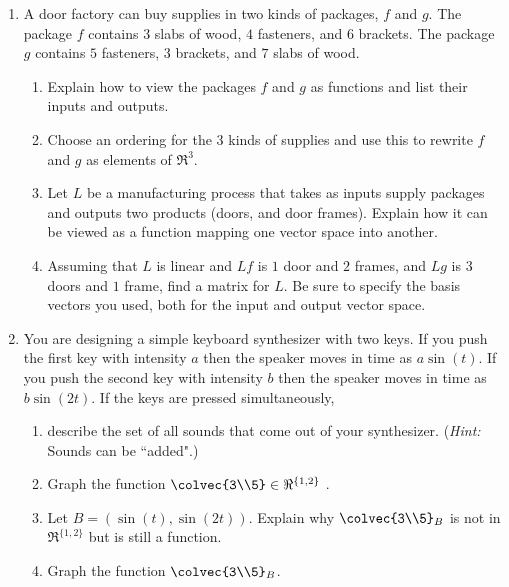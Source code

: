 


\begin{enumerate}

\item A door factory can buy supplies in two kinds of packages, $f$ and $g$. 
The package $f$ contains $3$ slabs of wood, $4$ fasteners, and $6$ brackets. 
The package $g$ contains $5$ fasteners, $3$ brackets, and $7$ slabs of wood. 
\begin{enumerate}
\item Explain how to view the packages $f$ and $g$ as functions and list their inputs and outputs. \\
\item Choose  an ordering for  the 3 kinds of supplies and use this to  rewrite $f$ and $g$ as elements of $\Re^3$.\\
\item Let $L$ be a manufacturing process that takes as inputs supply packages and outputs two products (doors, and door frames). Explain how it  can be viewed as a function 
mapping one vector space into another. 
\item
Assuming that $L$ is linear and  $Lf$ is $1$ door and $2$ frames, and $Lg$ is $3$ doors and $1$ frame, find a matrix for $L$. Be sure to specify the basis vectors you used, both for the input and output vector space.
\end{enumerate}


\item You are designing a simple keyboard synthesizer with two keys. 
If you push the first key with intensity $a$ then the speaker moves in time as $a\sin(t)$.
If you push the second key with intensity $b$ then the speaker moves in time as $b\sin(2t)$. 
If the keys are pressed simultaneously, \\
\begin{enumerate}
\item describe the set of all sounds that come out of your synthesizer. 
({\itshape Hint:} Sounds can be ``added".)\\
\item  Graph the  function $\colvec{3\\5}\in \Re^{\{1,2\}}$ .
\item Let $B=(\sin(t), \sin(2t))$. 
Explain why $\colvec{3\\5}_B$ is not in $\Re^{\{1,2\}}$ but is still a function.
\item Graph the function $\colvec{3\\5}_B$.
\end{enumerate}


\end{enumerate}
